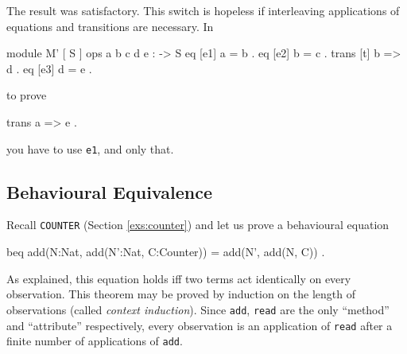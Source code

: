 \documentclass[a4paper]{memoir}
\begin{document}
The result was satisfactory. This switch is hopeless if interleaving
applications of equations and transitions are necessary. In
\begin{vvtm}
\begin{ccode}
  module M' {
    [ S ]
    ops a b c d e : -> S
    eq [e1] a = b .
    eq [e2] b = c .
    trans [t] b => d .
    eq [e3] d = e .
  }
\end{ccode}
\end{vvtm}
to prove
\begin{vvtm}
\begin{ccode}
  trans a => e .
\end{ccode}
\end{vvtm}
you have to use \verb|e1|, and only that.

\subsection{Behavioural Equivalence}\label{sec:p2-proving-beh-eq}

Recall \verb|COUNTER| (Section \ref{exs:counter}) and let us prove
a behavioural equation
\begin{vvtm}
\begin{ccode}
  beq add(N:Nat, add(N':Nat, C:Counter)) = add(N', add(N, C)) .
\end{ccode}
\end{vvtm}
As explained, this equation holds iff two terms act
identically on every observation. This theorem may be proved
by induction on the length of observations
(called {\em context induction}).
Since \verb|add|, \verb|read| are the only ``method'' and ``attribute''
respectively, every observation is an application of \verb|read|
after a finite number of applications of \verb|add|.
\end{document}
